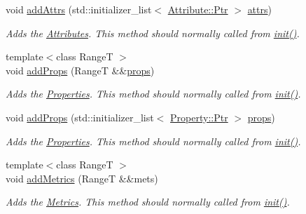 \begin{DoxyCompactItemize}
void \hyperlink{classdg_1_1deepcore_1_1_node_a617b988fbfba7860b91bc1e7f46d67fb}{add\+Attrs} (std\+::initializer\+\_\+list$<$ \hyperlink{classdg_1_1deepcore_1_1_object_a4565c5c2ba828aaaa4354befbac8b2f9}{Attribute\+::\+Ptr} $>$ \hyperlink{classdg_1_1deepcore_1_1_node_acbf1083b3a00898cbd5170ac730e5777}{attrs})
\begin{DoxyCompactList}\small\item\em Adds the \hyperlink{classdg_1_1deepcore_1_1_attribute}{Attributes}. This method should normally called from \hyperlink{classdg_1_1deepcore_1_1_object_a0982aef61087daaf910acfe8b6dcac99}{init()}. \end{DoxyCompactList}\item 
{\footnotesize template$<$class RangeT $>$ }\\void \hyperlink{classdg_1_1deepcore_1_1_node_a8d597936ca9b59ea9932da1738d98791}{add\+Props} (RangeT \&\&\hyperlink{classdg_1_1deepcore_1_1_node_a24db8fed9656e8dab99eaa0c1f02e3cb}{props})
\begin{DoxyCompactList}\small\item\em Adds the \hyperlink{classdg_1_1deepcore_1_1_property}{Properties}. This method should normally called from \hyperlink{classdg_1_1deepcore_1_1_object_a0982aef61087daaf910acfe8b6dcac99}{init()}. \end{DoxyCompactList}\item 
void \hyperlink{classdg_1_1deepcore_1_1_node_a0e0cb94c9913b7283f4bb74c8aff0c75}{add\+Props} (std\+::initializer\+\_\+list$<$ \hyperlink{classdg_1_1deepcore_1_1_object_a4565c5c2ba828aaaa4354befbac8b2f9}{Property\+::\+Ptr} $>$ \hyperlink{classdg_1_1deepcore_1_1_node_a24db8fed9656e8dab99eaa0c1f02e3cb}{props})
\begin{DoxyCompactList}\small\item\em Adds the \hyperlink{classdg_1_1deepcore_1_1_property}{Properties}. This method should normally called from \hyperlink{classdg_1_1deepcore_1_1_object_a0982aef61087daaf910acfe8b6dcac99}{init()}. \end{DoxyCompactList}\item 
{\footnotesize template$<$class RangeT $>$ }\\void \hyperlink{classdg_1_1deepcore_1_1_node_a0815e338b1fe1183bf9e05997af9a53e}{add\+Metrics} (RangeT \&\&mets)
\begin{DoxyCompactList}\small\item\em Adds the \hyperlink{classdg_1_1deepcore_1_1_metric}{Metrics}. This method should normally called from \hyperlink{classdg_1_1deepcore_1_1_object_a0982aef61087daaf910acfe8b6dcac99}{init()}. \end{DoxyCompactList}\item 

\end{DoxyCompactItemize}
